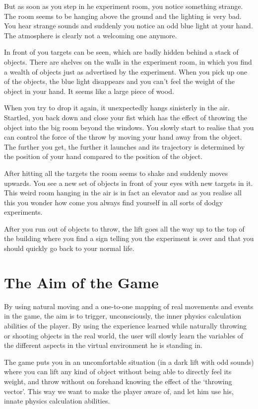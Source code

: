 \documentclass[a4paper]{article}
\begin{document}
But as soon as you step in he experiment room, you notice something strange. The
room seems to be hanging above the ground and the lighting is very bad. You hear
strange sounds and suddenly you notice an odd blue light at your hand. The
atmosphere is clearly not a welcoming one anymore.

In front of you targets can be seen, which are badly hidden behind a stack of objects.
There are shelves on the walls in the experiment room, in which you find a wealth of
objects just as advertised by the experiment. When you pick up one of the objects,
the blue light disappears and you can't feel the weight of the object in your hand.
It seems like a large piece of wood.

When you try to drop it again, it unexpectedly hangs sinisterly in the air. Startled, you back
down and close your fist which has the effect of throwing the object into the big room
beyond the windows. You slowly start to realise that you can control the force of the
throw by moving your hand away from the object. The further you get, the further
it launches and its trajectory is determined by the position of your hand
compared to the position of the object.

After hitting all the targets the room seems to shake and suddenly moves upwards.
You see a new set of objects in front of your eyes with new targets in it. This
weird room hanging in the air is in fact an elevator and as you realise all this
you wonder how come you always find yourself in all sorts of dodgy experiments.

After you run out of objects to throw, the lift goes all the way up to the top of
the building where you find a sign telling you the experiment is over and that you
should quickly go back to your normal life.


\section{The Aim of the Game}
\label{sec:aim}

By using natural moving and a one-to-one mapping of real movements and events in
the game, the aim is to trigger, unconsciously, the inner physics calculation
abilities of the player. By using the experience learned while naturally throwing
or shooting objects in the real world, the user will slowly learn the variables
of the different aspects in the virtual environment he is standing in.

The game puts you in an uncomfortable situation (in a dark lift with odd sounds)
where you can lift any kind of object without being able to directly feel its weight,
and throw without on forehand knowing the effect of the `throwing vector'. This way
we want to make the player aware of, and let him use his, innate physics calculation
abilities.
\end{document}
